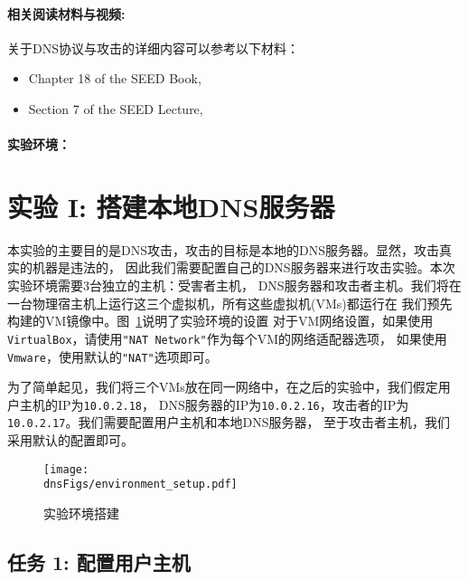 \paragraph{相关阅读材料与视频:}
关于DNS协议与攻击的详细内容可以参考以下材料：

\begin{itemize}
\item Chapter 18 of the SEED Book, \seedbook
\item Section 7 of the SEED Lecture, \seedisvideo
\end{itemize}



\paragraph{实验环境：} \seedenvironment



\section{实验 I: 搭建本地DNS服务器}

本实验的主要目的是DNS攻击，攻击的目标是本地的DNS服务器。显然，攻击真实的机器是违法的，
因此我们需要配置自己的DNS服务器来进行攻击实验。本次实验环境需要3台独立的主机：受害者主机，
DNS服务器和攻击者主机。我们将在一台物理宿主机上运行这三个虚拟机，所有这些虚拟机(VMs)都运行在
我们预先构建的\ubuntu VM镜像中。图~\ref{dns:fig:environment}说明了实验环境的设置
对于VM网络设置，如果使用{\tt VirtualBox}，请使用{\tt "NAT Network"}作为每个VM的网络适配器选项，
如果使用{\tt Vmware}，使用默认的{\tt "NAT"}选项即可。


为了简单起见，我们将三个VMs放在同一网络中，在之后的实验中，我们假定用户主机的IP为{\tt 10.0.2.18}，
DNS服务器的IP为{\tt 10.0.2.16}，攻击者的IP为{\tt 10.0.2.17}。我们需要配置用户主机和本地DNS服务器，
至于攻击者主机，我们采用默认的配置即可。


\begin{figure}[htb]
\centering
\texttt{[image: \\dnsFigs/environment\_setup.pdf]}
\caption{实验环境搭建}
\label{dns:fig:environment}
\end{figure}


\subsection{任务 1: 配置用户主机}

